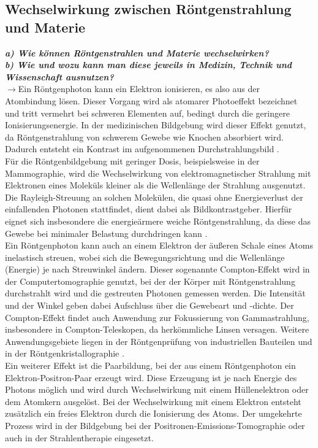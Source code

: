 \subsection{\label{subsec:FZV2}Wechselwirkung zwischen Röntgenstrahlung und Materie}
\textbf{\textit{a) Wie können Röntgenstrahlen und Materie wechselwirken? \\
b) Wie und wozu kann man diese jeweils in Medizin, Technik und Wissenschaft
ausnutzen?}}\\
$\rightarrow$Ein Röntgenphoton kann ein Elektron ionisieren, es also aus der Atombindung lösen. 
Dieser Vorgang wird als atomarer Photoeffekt bezeichnet und tritt vermehrt bei schweren Elementen auf, 
bedingt durch die geringere Ionisierungsenergie. 
In der medizinischen Bildgebung wird dieser Effekt genutzt, da Röntgenstrahlung von schwerem Gewebe wie Knochen absorbiert wird. 
Dadurch entsteht ein Kontrast im aufgenommenen Durchstrahlungsbild \cite{Demtroder}. \\
Für die Röntgenbildgebung mit geringer Dosis, beispielsweise in der Mammographie, 
wird die Wechselwirkung von elektromagnetischer Strahlung mit Elektronen eines Moleküls kleiner 
als die Wellenlänge der Strahlung ausgenutzt. 
Die Rayleigh-Streuung an solchen Molekülen, die quasi ohne Energieverlust der einfallenden Photonen stattfindet, 
dient dabei als Bildkontrastgeber. 
Hierfür eignet sich insbesondere die energieärmere weiche Röntgenstrahlung, 
da diese das Gewebe bei minimaler Belastung durchdringen kann \cite{Schwarz, WikiRo}. \\
Ein Röntgenphoton kann auch an einem Elektron der äußeren Schale eines Atoms inelastisch streuen, 
wobei sich die Bewegungsrichtung und die Wellenlänge (Energie) je nach Streuwinkel ändern. 
Dieser sogenannte Compton-Effekt wird in der Computertomographie genutzt, bei der der Körper mit Röntgenstrahlung durchstrahlt 
wird und die gestreuten Photonen gemessen werden. 
Die Intensität und der Winkel geben dabei Aufschluss über die Gewebeart und -dichte. 
Der Compton-Effekt findet auch Anwendung zur Fokussierung von Gammastrahlung, insbesondere in Compton-Teleskopen, 
da herkömmliche Linsen versagen. 
Weitere Anwendungsgebiete liegen in der Röntgenprüfung von industriellen Bauteilen und in der Röntgenkristallographie \cite{Schwarz, Compton}. \\
Ein weiterer Effekt ist die Paarbildung, bei der aus einem Röntgenphoton ein Elektron-Positron-Paar erzeugt wird. 
Diese Erzeugung ist je nach Energie des Photons möglich und wird durch Wechselwirkung mit einem Hüllenelektron oder dem Atomkern ausgelöst. 
Bei der Wechselwirkung mit einem Elektron entsteht zusätzlich ein freies Elektron durch die Ionisierung des Atoms. 
Der umgekehrte Prozess wird in der Bildgebung bei der Positronen-Emissions-Tomographie oder auch in der Strahlentherapie eingesetzt. \cite{WikiRo}

